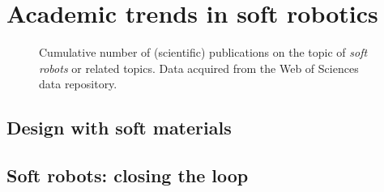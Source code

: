 \section{Academic trends in soft robotics}
%
\begin{figure}[!t]
    \ifx\printFigures\undefined
    \else
    \centering
    
    \fi
    \caption{Cumulative number of (scientific) publications on the topic of \emph{soft robots} or related topics. Data acquired from the Web of Sciences data repository.}
    \label{fig:C0:publicationhistory}
  \end{figure}

\subsection{Design with soft materials}

\subsection{Soft robots: closing the loop}